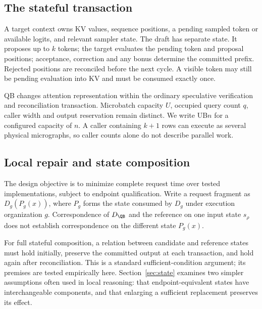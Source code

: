 \subsection{The stateful transaction}
A target context owns KV values, sequence positions, a pending sampled token or available logits, and relevant sampler state. The draft has separate state. It proposes up to $k$ tokens; the target evaluates the pending token and proposal positions; acceptance, correction and any bonus determine the committed prefix. Rejected positions are reconciled before the next cycle. A visible token may still be pending evaluation into KV and must be consumed exactly once.

QB changes attention representation within the ordinary speculative verification and reconciliation transaction. Microbatch capacity $U$, occupied query count $q$, caller width and output reservation remain distinct. We write UB$n$ for a configured capacity of $n$. A caller containing $k+1$ rows can execute as several physical micrographs, so caller counts alone do not describe parallel work.

\subsection{Local repair and state composition}
The design objective is to minimize complete request time over tested implementations, subject to endpoint qualification. Write a request fragment as $D_g(P_g(x))$, where $P_g$ forms the state consumed by $D_g$ under execution organization $g$. Correspondence of $D_{\QB}$ and the reference on one input state $s_\rho$ does not establish correspondence on the different state $P_g(x)$.

For full stateful composition, a relation between candidate and reference states must hold initially, preserve the committed output at each transaction, and hold again after reconciliation. This is a standard sufficient-condition argument; its premises are tested empirically here. Section~\ref{sec:state} examines two simpler assumptions often used in local reasoning: that endpoint-equivalent states have interchangeable components, and that enlarging a sufficient replacement preserves its effect.
